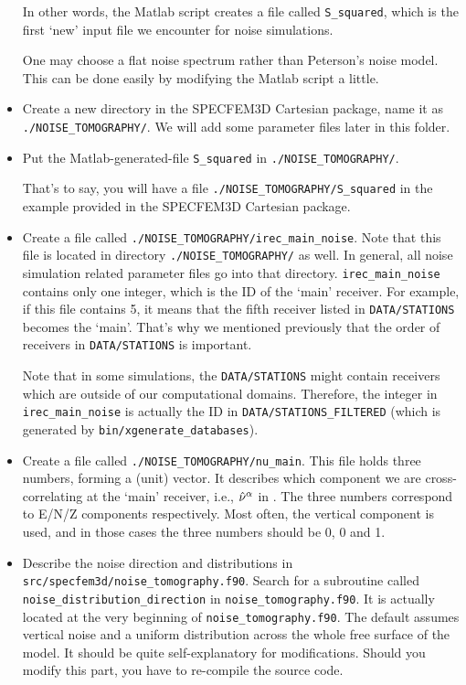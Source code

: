\begin{itemize}
In other words, the Matlab script creates a file called \texttt{S\_squared},
which is the first `new' input file we encounter for noise simulations.

One may choose a flat noise spectrum rather than Peterson's noise
model. This can be done easily by modifying the Matlab script a little.

\item Create a new directory in the SPECFEM3D Cartesian package, name it
as \texttt{./NOISE\_TOMOGRAPHY/}. We will add some parameter
files later in this folder.

\item Put the Matlab-generated-file \texttt{S\_squared} in \texttt{./NOISE\_TOMOGRAPHY/}.

That's to say, you will have a file \texttt{./NOISE\_TOMOGRAPHY/S\_squared}
in the example provided in the SPECFEM3D Cartesian package.

\item Create a file called \texttt{./NOISE\_TOMOGRAPHY/irec\_main\_noise}.
Note that this file is located in directory \texttt{./NOISE\_TOMOGRAPHY/}
as well. In general, all noise simulation related parameter files
go into that directory. \texttt{irec\_main\_noise} contains only
one integer, which is the ID of the `main' receiver. For example,
if this file contains 5, it means that the fifth receiver listed in
\texttt{DATA/STATIONS} becomes the `main'. That's why we mentioned
previously that the order of receivers in \texttt{DATA/STATIONS} is
important.\newline


Note that in some simulations, the \texttt{DATA/STATIONS} might
contain receivers which are outside of our computational domains.
Therefore, the integer in \texttt{irec\_main\_noise} is actually
the ID in \texttt{DATA/STATIONS\_FILTERED} (which is generated by
\texttt{bin/xgenerate\_databases}).

\item Create a file called \texttt{./NOISE\_TOMOGRAPHY/nu\_main}.
This file holds three numbers, forming a (unit) vector. It describes
which component we are cross-correlating at the `main' receiver,
i.e., ${\hat{{\bf \nu}}}^{\alpha}$ in \citet{trompetal2010}. The
three numbers correspond to E/N/Z components respectively. Most often,
the vertical component is used, and in those cases the three numbers
should be 0, 0 and 1.

\item Describe the noise direction and distributions in \texttt{src/specfem3d/noise\_tomography.f90}.
Search for a subroutine called \texttt{noise\_distribution\_direction}
in \texttt{noise\_tomography.f90}. It is actually located at the very
beginning of \texttt{noise\_tomography.f90}. The default assumes vertical
noise and a uniform distribution across the whole free surface of
the model. It should be quite self-explanatory for modifications.
Should you modify this part, you have to re-compile the source code.
\end{itemize}


